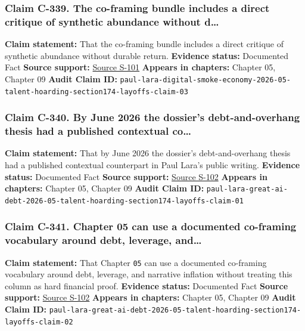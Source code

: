 \documentclass[
  american,
  11pt,
  letterpaper,
]{article}
\begin{document}
\subsubsection{Claim C-339. The co-framing bundle includes a direct
critique of synthetic abundance without
d\ldots{}}\label{claim-c-339-the-co-framing-bundle-includes-a-direct-critique-of-synthetic-abundance-without-d}

\textbf{Claim statement:} That the co-framing bundle includes a direct
critique of synthetic abundance without durable return. \textbf{Evidence
status:} Documented Fact \textbf{Source support:}
\hyperref[source-s-101-la-econom-a-del-humo-digital]{Source S-101}
\textbf{Appears in chapters:} Chapter 05, Chapter 09 \textbf{Audit Claim
ID:}
\texttt{paul-lara-digital-smoke-economy-2026-05-talent-hoarding-section174-layoffs-claim-03}

\subsubsection{Claim C-340. By June 2026 the dossier's debt-and-overhang
thesis had a published contextual
co\ldots{}}\label{claim-c-340-by-june-2026-the-dossier-s-debt-and-overhang-thesis-had-a-published-contextual-co}

\textbf{Claim statement:} That by June 2026 the dossier's
debt-and-overhang thesis had a published contextual counterpart in Paul
Lara's public writing. \textbf{Evidence status:} Documented Fact
\textbf{Source support:}
\hyperref[source-s-102-la-gran-deuda-por-la-ia]{Source S-102}
\textbf{Appears in chapters:} Chapter 05, Chapter 09 \textbf{Audit Claim
ID:}
\texttt{paul-lara-great-ai-debt-2026-05-talent-hoarding-section174-layoffs-claim-01}

\subsubsection{Claim C-341. Chapter 05 can use a documented co-framing
vocabulary around debt, leverage,
and\ldots{}}\label{claim-c-341-chapter-05-can-use-a-documented-co-framing-vocabulary-around-debt-leverage-and}

\textbf{Claim statement:} That Chapter \texttt{05} can use a documented
co-framing vocabulary around debt, leverage, and narrative inflation
without treating this column as hard financial proof. \textbf{Evidence
status:} Documented Fact \textbf{Source support:}
\hyperref[source-s-102-la-gran-deuda-por-la-ia]{Source S-102}
\textbf{Appears in chapters:} Chapter 05, Chapter 09 \textbf{Audit Claim
ID:}
\texttt{paul-lara-great-ai-debt-2026-05-talent-hoarding-section174-layoffs-claim-02}
\end{document}
